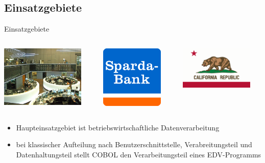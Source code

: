 \documentclass[handout]{beamer}
\begin{document}
\subsection{Einsatzgebiete}
\begin{frame}{Einsatzgebiete}
	\pause
	\begin{columns}[t]
		\begin{column}{4cm}
			\includegraphics[width=4cm]{Deutsche-boerse}
		\end{column}
	\pause
		\begin{column}{3cm}
			\includegraphics[width=3cm]{sparda_logo}
		\end{column}
	\pause
		\begin{column}{3.5cm}
			\includegraphics[width=3.5cm]{california-state-flag1} 
		\end{column}
	\end{columns}
	\pause
	\begin{itemize}[<+->]
		\item
			Haupteinsatzgebiet ist betriebswirtschaftliche Datenverarbeitung
		\item
			bei klassischer Aufteilung nach Benutzerschnittstelle, Verabreitungsteil und Datenhaltungsteil stellt COBOL den Verarbeitungsteil eines EDV-Programms
	\end{itemize}
\end{frame}
\end{document}
